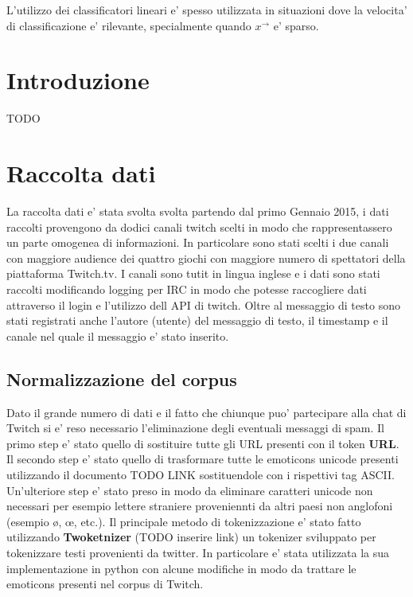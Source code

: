 \documentclass[a4paper,11pt]{book}
\theoremstyle{definition}
\begin{document}
L'utilizzo dei classificatori lineari e' spesso utilizzata in situazioni dove la velocita' di classificazione
e' rilevante, specialmente quando $x^\rightarrow$ e' sparso.


\chapter{Introduzione}
TODO

\chapter{Raccolta dati}
La raccolta dati e' stata svolta svolta partendo dal primo Gennaio 2015, i dati raccolti provengono da dodici canali twitch scelti in modo che rappresentassero un parte omogenea di informazioni.
In particolare sono stati scelti i due canali con maggiore audience dei quattro giochi con maggiore numero di spettatori della piattaforma Twitch.tv.
I canali sono tutit in lingua inglese e i dati sono stati raccolti modificando logging per IRC  in modo che potesse raccogliere dati attraverso il login e l'utilizzo dell API di twitch.
Oltre al messaggio di testo sono stati registrati anche l'autore (utente) del messaggio di testo, il timestamp e il canale nel quale il messaggio e' stato inserito.

\section{Normalizzazione del corpus}
Dato il grande numero di dati e il fatto che chiunque puo' partecipare alla chat di Twitch si e' reso necessario l'eliminazione degli eventuali messaggi di spam. Il primo step e' stato quello di sostituire tutte gli URL presenti con il token \textbf{URL}. 
Il secondo step e' stato quello di trasformare tutte le emoticons unicode presenti utilizzando il documento TODO LINK sostituendole con i rispettivi tag ASCII. Un'ulteriore step e' stato preso in modo da eliminare caratteri unicode non necessari per esempio lettere straniere proveniennti da altri paesi non anglofoni (esempio \o, \oe, etc.).
Il principale metodo di tokenizzazione e' stato fatto utilizzando \textbf{Twoketnizer} (TODO inserire link) un tokenizer sviluppato per tokenizzare testi provenienti da twitter. In particolare e' stata utilizzata la sua implementazione in python con alcune modifiche in modo da trattare le emoticons presenti nel corpus di Twitch.
\end{document}
